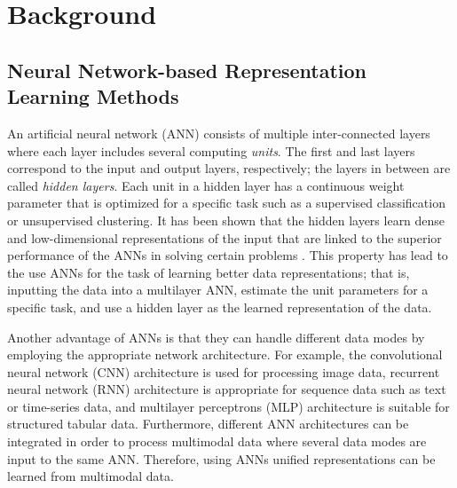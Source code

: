 \chapter{Background}


\section{Neural Network-based Representation Learning Methods}

An artificial neural network (ANN) consists of multiple inter-connected layers where each layer includes several computing \textit{units}. The first and last layers correspond to the input and output layers, respectively; the layers in between are called \textit{hidden layers}. Each unit in a hidden layer has a continuous weight parameter that is optimized for a specific task such as a supervised classification or unsupervised clustering. It has been shown that the hidden layers learn dense and low-dimensional representations of the input that are linked to the superior performance of the ANNs in solving certain problems \cite{bengio2013representation}. This property has lead to the use ANNs for the task of learning better data representations; that is, inputting the data into a multilayer ANN, estimate the unit parameters for a specific task, and use a hidden layer as the learned representation of the data.

Another advantage of ANNs is that they can handle different data modes by employing the appropriate network architecture. For example, the convolutional neural network (CNN) architecture \cite{lecun1998gradient} is used for processing image data, recurrent neural network (RNN) architecture \cite{hochreiter1997long} is appropriate for sequence data such as text or time-series data, and multilayer perceptrons (MLP) architecture is suitable for structured tabular data. Furthermore, different ANN architectures can be integrated in order to process multimodal data where several data modes are input to the same ANN. Therefore, using ANNs unified representations can be learned from multimodal data.

